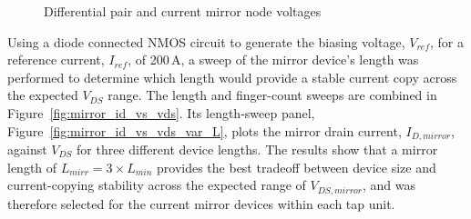 \begin{figure}[H]
	\caption{Differential pair and current mirror node voltages}\label{fig:diff_pair_mirror_node_voltages}
\end{figure}

Using a diode connected NMOS circuit to generate the biasing voltage, $V_{ref}$, for a reference current, $I_{ref}$, of 200\,\textmu A, a sweep of the mirror device's length was performed to determine which length would provide a stable current copy across the expected $V_{DS}$ range. The length and finger-count sweeps are combined in Figure~\ref{fig:mirror_id_vs_vds}. Its length-sweep panel, Figure~\ref{fig:mirror_id_vs_vds_var_L}, plots the mirror drain current, $I_{D,mirror}$, against $V_{DS}$ for three different device lengths. The results show that a mirror length of $L_{mirr} = 3 \times L_{min}$ provides the best tradeoff between device size and current-copying stability across the expected range of $V_{DS,mirror}$, and was therefore selected for the current mirror devices within each tap unit.

